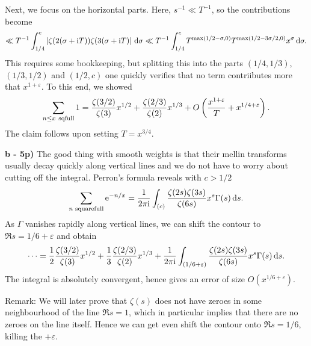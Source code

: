 \documentclass[a4paper,11pt]{article}
\begin{document}
Next, we focus on the horizontal parts. Here, $s^{-1} \ll T^{-1}$, so the
contributions become
\[
    \ll T^{-1} \int_{1/4}^c \left\lvert \zeta(2(\sigma+\mathrm i T))\zeta(3(\sigma+\mathrm i T) \right\rvert \mathrm{\,d} 
    \sigma \ll T^{-1} \int_{1/4}^c T^{\max(1/2-\sigma, 0)} T^{\max(1/2-3\sigma/2,0)}
    x^\sigma \mathrm{\,d} \sigma.
\]
This requires some bookkeeping, but splitting this into the parts
$(1/4, 1/3)$, $(1/3, 1/2)$ and $(1/2, c)$ one quickly verifies that 
no term contriibutes more that $x^{1+\varepsilon}$. To this end, we showed
\[
    \sum_{n \leq x \rm \ sqfull} 1 
    = \frac{\zeta(3/2)}{\zeta(3)}x^{1/2} + \frac{\zeta(2/3)}{\zeta(2)} x^{1/3}
    + O\left( \frac{x^{1+\varepsilon}}T + x^{1/4 + \varepsilon}\right).
\]
The claim follows upon setting $T = x^{3/4}$. 

\textbf{b - 5p)} The good thing with smooth weights is that their mellin transforms
usually decay quickly along vertical lines and we do not have to worry about cutting
off the integral. Perron's formula reveals with $c > 1/2$
\[
    \sum_{n \text{ squarefull}} \mathrm e^{-n/x} = \frac{1}{2 \pi \mathrm i} \int_{(c)} \frac{\zeta(2s) \zeta(3s)}
    {\zeta(6s)} x^s \Gamma(s) \mathrm{\,d} s.
\]
As $\Gamma$ vanishes rapidly along vertical lines, we can shift the contour to 
$\Re s = 1/6 + \varepsilon$ and obtain
\[
    \dots = \frac 12 \frac{\zeta(3/2)}{\zeta(3)} x^{1/2} + 
    \frac 13 \frac{\zeta(2/3)}{\zeta(2)} x^{1/3} + \frac{1}{2 \pi \mathrm i} \int_{(1/6 + \varepsilon)}
    \frac{\zeta(2s) \zeta(3s)} {\zeta(6s)} x^s \Gamma(s) \mathrm{\,d} s.
\]
The integral is absolutely convergent, hence gives an error of size
$O(x^{1/6+\varepsilon})$.

Remark: We will later prove that $\zeta(s)$ does not have zeroes in some
neighbourhood of the line $\Re s = 1$, which in particular implies that there
are no zeroes on the line itself. Hence we can get even shift the contour onto
$\Re s = 1/6$, killing the $+\varepsilon$. 
\end{document}
